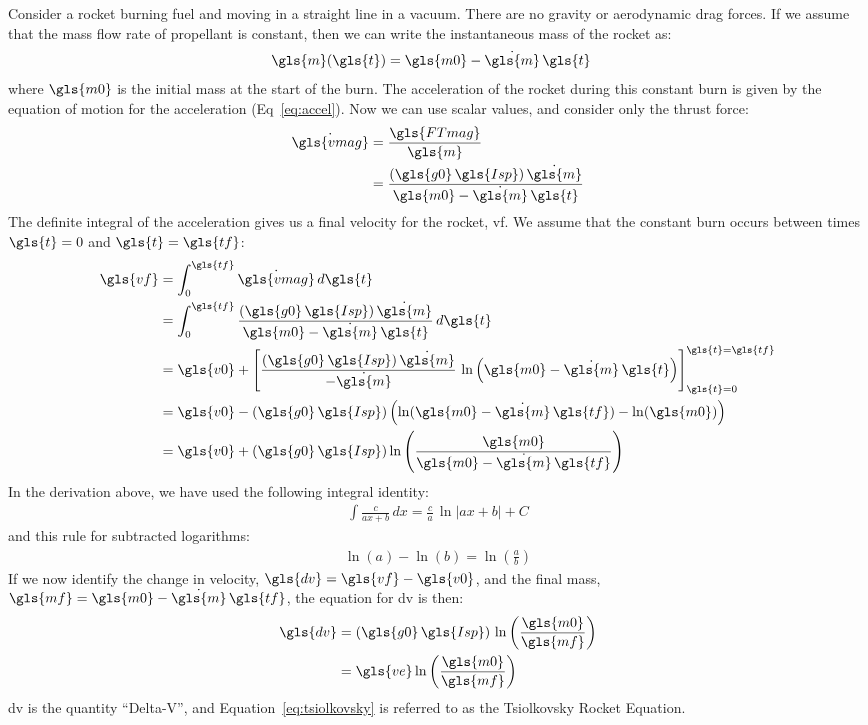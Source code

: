 \documentclass[12pt,openany]{book}
\begin{document}
Consider a rocket burning fuel and moving in a straight line in a vacuum. There are no gravity or aerodynamic drag forces. If we assume that the mass flow rate of propellant is constant, then we can write the instantaneous mass of the rocket as:
\begin{align}
  \gls{m}(\gls{t}) &= \gls{m0} - \dot{\gls{m}}\,\gls{t}
\end{align}
where $\gls{m0}$ is the initial mass at the start of the burn. The acceleration of the rocket during this constant burn is given by the equation of motion for the acceleration (Eq~\ref{eq:accel}). Now we can use scalar values, and consider only the thrust force:
\begin{align}
  \dot{\gls{vmag}} &= \frac{\gls{FTmag}}{\gls{m}} \\
  &= \frac{(\gls{g0}\,\gls{Isp})\,\dot{\gls{m}}}{\gls{m0} - \dot{\gls{m}}\,\gls{t}}
\end{align}
The definite integral of the acceleration gives us a final velocity for the rocket, \gls{vf}. We assume that the constant burn occurs between times $\gls{t}=0$ and $\gls{t}=\gls{tf}$:
\begin{align}
  \gls{vf} &= \int_0^{\gls{tf}} \dot{\gls{vmag}}\,d\gls{t} \\
  &= \int_0^{\gls{tf}} \frac{(\gls{g0}\,\gls{Isp})\,\dot{\gls{m}}}{\gls{m0} - \dot{\gls{m}}\,\gls{t}}\,d\gls{t} \\
  &= \gls{v0} + \left[\frac{(\gls{g0}\,\gls{Isp})\,\dot{\gls{m}}}{-\dot{\gls{m}}}\,\ln\left(\gls{m0}-\dot{\gls{m}}\,\gls{t}\right)\right]_{\gls{t}=0}^{\gls{t}=\gls{tf}} \\
  &= \gls{v0} - (\gls{g0}\,\gls{Isp})\left(\ln(\gls{m0}-\dot{\gls{m}}\,\gls{tf})-\ln(\gls{m0})\right) \\
  &= \gls{v0} + (\gls{g0}\,\gls{Isp})\ln\left(\frac{\gls{m0}}{\gls{m0}-\dot{\gls{m}}\,\gls{tf}}\right)
\end{align}
In the derivation above, we have used the following integral identity:
\begin{align}
  \int \frac{c}{ax+b}\,dx = \frac{c}{a}\,\ln\left|ax+b\right| + C
\end{align} 
and this rule for subtracted logarithms:
\begin{align}
  \ln(a) - \ln(b) = \ln\left(\frac{a}{b}\right)
\end{align}
If we now identify the change in velocity, $\gls{dv}=\gls{vf}-\gls{v0}$, and the final mass, $\gls{mf}=\gls{m0}-\dot{\gls{m}}\,\gls{tf}$, the equation for \gls{dv} is then:
\begin{align}
  \gls{dv} &= (\gls{g0}\,\gls{Isp})\,\ln\left(\frac{\gls{m0}}{\gls{mf}}\right) \\
  &= \gls{ve}\ln\left(\frac{\gls{m0}}{\gls{mf}}\right) \label{eq:tsiolkovsky}
\end{align}
\gls{dv} is the quantity ``Delta-V'', and Equation~\ref{eq:tsiolkovsky} is referred to as the Tsiolkovsky Rocket Equation.
\end{document}
